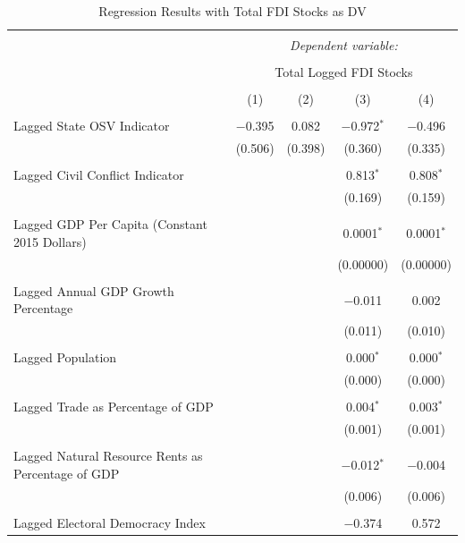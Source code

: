 \documentclass[11pt, titlepage]{article} %
\begin{document}
\begin{table}[!htbp] \centering 
  \caption{Regression Results with Total FDI Stocks as DV} 
  \label{totalstocksDV} 
\small 
\begin{tabular}{@{\extracolsep{5pt}}lcccc} 
\\[-1.8ex]\hline 
\hline \\[-1.8ex] 
 & \multicolumn{4}{c}{\textit{Dependent variable:}} \\ 
\cline{2-5} 
\\[-1.8ex] & \multicolumn{4}{c}{Total Logged FDI Stocks} \\ 
\\[-1.8ex] & (1) & (2) & (3) & (4)\\ 
\hline \\[-1.8ex] 
 Lagged State OSV Indicator & $-$0.395 & 0.082 & $-$0.972$^{*}$ & $-$0.496 \\ 
  & (0.506) & (0.398) & (0.360) & (0.335) \\ 
  & & & & \\ 
 Lagged Civil Conflict Indicator &  &  & 0.813$^{*}$ & 0.808$^{*}$ \\ 
  &  &  & (0.169) & (0.159) \\ 
  & & & & \\ 
 Lagged GDP Per Capita (Constant 2015 Dollars) &  &  & 0.0001$^{*}$ & 0.0001$^{*}$ \\ 
  &  &  & (0.00000) & (0.00000) \\ 
  & & & & \\ 
 Lagged Annual GDP Growth Percentage &  &  & $-$0.011 & 0.002 \\ 
  &  &  & (0.011) & (0.010) \\ 
  & & & & \\ 
 Lagged Population &  &  & 0.000$^{*}$ & 0.000$^{*}$ \\ 
  &  &  & (0.000) & (0.000) \\ 
  & & & & \\ 
 Lagged Trade as Percentage of GDP &  &  & 0.004$^{*}$ & 0.003$^{*}$ \\ 
  &  &  & (0.001) & (0.001) \\ 
  & & & & \\ 
 Lagged Natural Resource Rents as Percentage of GDP &  &  & $-$0.012$^{*}$ & $-$0.004 \\ 
  &  &  & (0.006) & (0.006) \\ 
  & & & & \\ 
 Lagged Electoral Democracy Index &  &  & $-$0.374 & 0.572 \\ 

\end{tabular}
\end{table}
\end{document}
